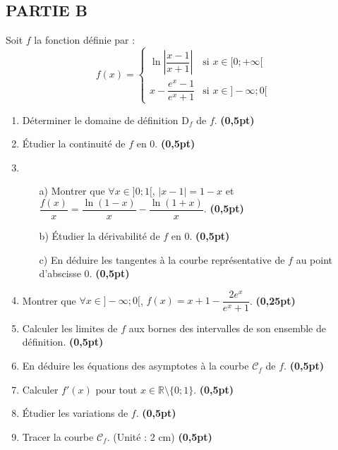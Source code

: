 \documentclass[12pt]{article}
\begin{document}
\subsection*{PARTIE B}

Soit \( f \) la fonction définie par :
\[
f(x) = 
\begin{cases}
\ln\left|\dfrac{x - 1}{x + 1}\right| & \text{si } x \in [0 ; +\infty[ \\
x-\dfrac{e^x - 1}{e^x + 1} & \text{si } x \in ]-\infty ; 0[
\end{cases}
\]

\begin{enumerate}
    \item Déterminer le domaine de définition \( \text{D}_f \) de \( f \). \hfill \textbf{(0,5pt)}
    
    \item Étudier la continuité de \( f \) en 0. \hfill \textbf{(0,5pt)}
    
    \item 
    \begin{enumerate}
        \item[a)] Montrer que \( \forall x \in ]0 ; 1[ \), \( |x - 1| = 1 - x \) et 
        \(\dfrac{f(x)}{x} = \dfrac{\ln(1 - x)}{x} - \dfrac{\ln(1 + x)}{x}.\) 
        \hfill \textbf{(0,5pt)}
        
        \item[b)] Étudier la dérivabilité de \( f \) en 0. \hfill \textbf{(0,5pt)}
        
        \item[c)] En déduire les tangentes à la courbe représentative de \( f \) au point d’abscisse 0. \hfill \textbf{(0,5pt)}
    \end{enumerate}
    
    \item Montrer que \( \forall x \in ]-\infty ; 0[ \), \( f(x) = x + 1 - \dfrac{2e^x}{e^x + 1} \). \hfill \textbf{(0,25pt)}
    
    \item Calculer les limites de \( f \) aux bornes des intervalles de son ensemble de définition. \hfill \textbf{(0,5pt)}
    
    \item En déduire les équations des asymptotes à la courbe \( \mathcal{C}_f \) de \( f \). \hfill \textbf{(0,5pt)}
    
    \item Calculer \( f'(x) \) pour tout \( x \in \mathbb{R} \setminus \{0;1\} \). \hfill \textbf{(0,5pt)}
    
    \item Étudier les variations de \( f \). \hfill \textbf{(0,5pt)}
    
    \item Tracer la courbe \( \mathcal{C}_f \). (Unité : 2 cm) \hfill \textbf{(0,5pt)}
\end{enumerate}
\end{document}
